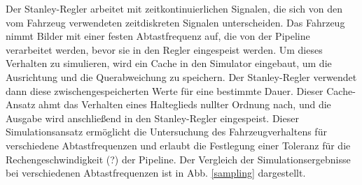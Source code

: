 \documentclass[arbeit=studie,oneside,BCOR=12mm]{ArbeitRST}
\begin{document}
Der Stanley-Regler arbeitet mit zeitkontinuierlichen Signalen, die sich von den
vom Fahrzeug verwendeten zeitdiskreten Signalen unterscheiden. Das Fahrzeug
nimmt Bilder mit einer festen Abtastfrequenz auf, die von der Pipeline
verarbeitet werden, bevor sie in den Regler eingespeist werden. Um dieses
Verhalten zu simulieren, wird ein Cache in den Simulator eingebaut, um die
Ausrichtung und die Querabweichung zu speichern. Der Stanley-Regler verwendet
dann diese zwischengespeicherten Werte für eine bestimmte Dauer. Dieser
Cache-Ansatz ahmt das Verhalten eines Halteglieds nullter Ordnung nach, und die
Ausgabe wird anschließend in den Stanley-Regler eingespeist. Dieser
Simulationsansatz ermöglicht die Untersuchung des Fahrzeugverhaltens für
verschiedene Abtastfrequenzen und erlaubt die Festlegung einer Toleranz für die
Rechengeschwindigkeit (?) der Pipeline. Der Vergleich der Simulationsergebnisse bei
verschiedenen Abtastfrequenzen ist in Abb. \ref{sampling} dargestellt.
\end{document}
